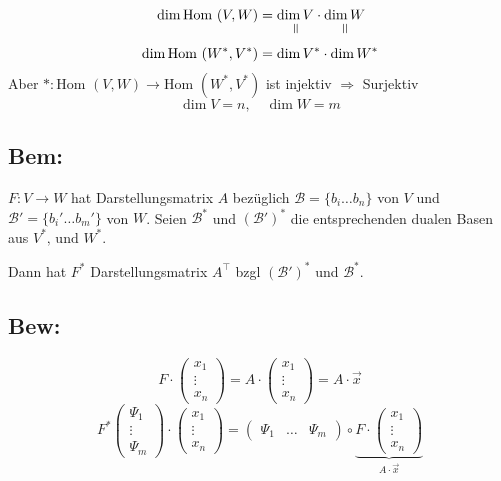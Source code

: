 \documentclass[titlepage,12pt,a4paper,ngerman]{report}
\newcommand{\verteq}{\rotatebox{90}{$\,=$}}
\newcommand{\equalto}[2]{\underset{\scriptstyle\overset{\mkern4mu\verteq}{#2}}{#1}}
\newcommand{\tx}[1]{\textrm{#1}}
\newcommand{\ub}[1]{\underbrace{#1}}
\begin{document}
\begin{align*}
\dim \tx{Hom }(V,W) &= \equalto{\dim V}{} \cdot \equalto{\dim W}{}\\
\dim \tx{Hom }(W^*,V^*) &= \dim V^* \cdot \dim W^*
\end{align*} 
Aber $*: \tx{Hom }(V,W) \to \tx{Hom }(W^*, V^*)$ ist injektiv $\Rightarrow$ Surjektiv
$$\dim V = n, \quad \dim W = m$$
\subsection*{Bem:}
$F: V \to W$ hat Darstellungsmatrix $A$ bezüglich $\mathcal B = \{b_i \dots b_n\}$ von $V$ und $\mathcal B' = \{b_i' \dots b_m'\}$ von $W$. Seien $\mathcal B^*$ und $(\mathcal B')^*$ die entsprechenden dualen Basen aus $V^* \tx{, und } W^*$.


Dann hat $ F^* $ Darstellungsmatrix $ A^\top $ bzgl $ (\mathcal{B}')^* $ und $ \mathcal{B}^* $.
\subsection{Bew:}
$$ F \cdot \begin{pmatrix}
x_1\\
\vdots\\
x_n
\end{pmatrix} = A \cdot \begin{pmatrix}
x_1 \\
\vdots\\
x_n
\end{pmatrix} = A \cdot \vec{x}$$
$$ F^* \begin{pmatrix}
\Psi_1\\
\vdots\\
\Psi_m
\end{pmatrix} \cdot \begin{pmatrix}
x_1\\
\vdots\\
x_n
\end{pmatrix} = \begin{pmatrix}
\Psi_1 & \dots & \Psi_m
\end{pmatrix} \circ \ub{F \cdot \begin{pmatrix}
	x_1\\
	\vdots \\
	x_n
	\end{pmatrix} }_{A \cdot \vec{x}} $$
\end{document}
